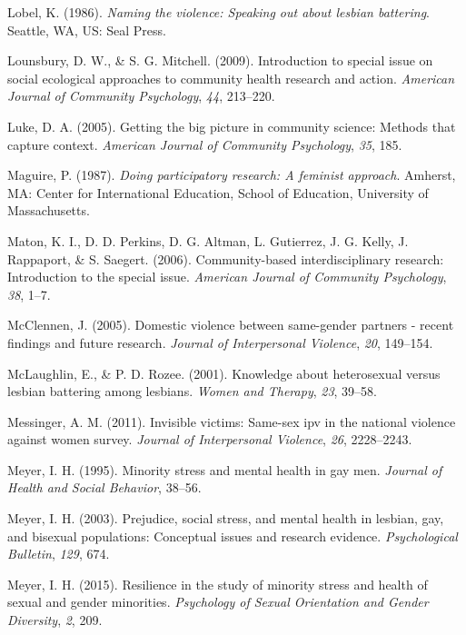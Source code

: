 \documentclass[11pt,]{tufte-book}
\begin{document}
\hypertarget{ref-lobel1986naming}{}
Lobel, K. (1986). \emph{Naming the violence: Speaking out about lesbian
battering}. Seattle, WA, US: Seal Press.

\hypertarget{ref-lounsbury2009introduction}{}
Lounsbury, D. W., \& S. G. Mitchell. (2009). Introduction to special
issue on social ecological approaches to community health research and
action. \emph{American Journal of Community Psychology}, \emph{44},
213--220.

\hypertarget{ref-luke2005getting}{}
Luke, D. A. (2005). Getting the big picture in community science:
Methods that capture context. \emph{American Journal of Community
Psychology}, \emph{35}, 185.

\hypertarget{ref-maguire1987doing}{}
Maguire, P. (1987). \emph{Doing participatory research: A feminist
approach}. Amherst, MA: Center for International Education, School of
Education, University of Massachusetts.

\hypertarget{ref-maton2006community}{}
Maton, K. I., D. D. Perkins, D. G. Altman, L. Gutierrez, J. G. Kelly, J.
Rappaport, \& S. Saegert. (2006). Community-based interdisciplinary
research: Introduction to the special issue. \emph{American Journal of
Community Psychology}, \emph{38}, 1--7.

\hypertarget{ref-mcclennen2005domestic}{}
McClennen, J. (2005). Domestic violence between same-gender partners -
recent findings and future research. \emph{Journal of Interpersonal
Violence}, \emph{20}, 149--154.

\hypertarget{ref-mclaughlin2001knowledge}{}
McLaughlin, E., \& P. D. Rozee. (2001). Knowledge about heterosexual
versus lesbian battering among lesbians. \emph{Women and Therapy},
\emph{23}, 39--58.

\hypertarget{ref-messinger2011invisible}{}
Messinger, A. M. (2011). Invisible victims: Same-sex ipv in the national
violence against women survey. \emph{Journal of Interpersonal Violence},
\emph{26}, 2228--2243.

\hypertarget{ref-meyer1995minority}{}
Meyer, I. H. (1995). Minority stress and mental health in gay men.
\emph{Journal of Health and Social Behavior}, 38--56.

\hypertarget{ref-meyer2003prejudice}{}
Meyer, I. H. (2003). Prejudice, social stress, and mental health in
lesbian, gay, and bisexual populations: Conceptual issues and research
evidence. \emph{Psychological Bulletin}, \emph{129}, 674.

\hypertarget{ref-meyer2015resilience}{}
Meyer, I. H. (2015). Resilience in the study of minority stress and
health of sexual and gender minorities. \emph{Psychology of Sexual
Orientation and Gender Diversity}, \emph{2}, 209.
\end{document}
